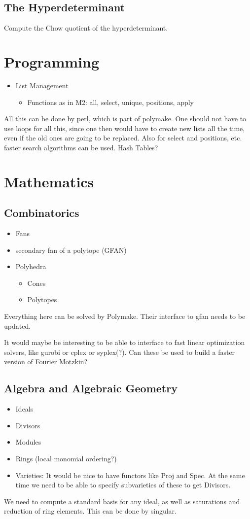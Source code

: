\documentclass[a4paper]{article}
\begin{document}
\subsection{The Hyperdeterminant}
Compute the Chow quotient of the hyperdeterminant.

\section{Programming}
\begin{itemize}
	\item[] List Management
	\begin{itemize}
		\item[] Functions as in M2: all, select, unique, positions, apply
	\end{itemize}
\end{itemize}
All this can be done by perl, which is part of polymake. One should not have to use loops for all this, since one then would have to create new lists all the time, even if the old ones are going to be replaced. Also for select and positions, etc. faster search algorithms can be used. Hash Tables?
\section{Mathematics}
\subsection{Combinatorics}
\begin{itemize}
	\item[] Fans
   \item[] secondary fan of a polytope (GFAN)
	\item[] Polyhedra
	\begin{itemize}
		\item[] Cones
		\item[] Polytopes
	\end{itemize}
\end{itemize}
Everything here can be solved by Polymake. Their interface to gfan needs to be updated.

It would maybe be interesting to be able to interface to fast linear optimization solvers, like gurobi or cplex or syplex(?). Can these be used to build a faster version of Fourier Motzkin?
\subsection{Algebra and Algebraic Geometry}
\begin{itemize}
   \item[] Ideals
	\item[] Divisors
	\item[] Modules
	\item[] Rings (local monomial ordering?)
	\item[] Varieties: It would be nice to have functors like Proj and Spec. At the same time we need to be able to specify subvarieties of these to get Divisors.
\end{itemize}
We need to compute a standard basis for any ideal, as well as saturations and reduction of ring elements.
This can be done by singular.
\end{document}
